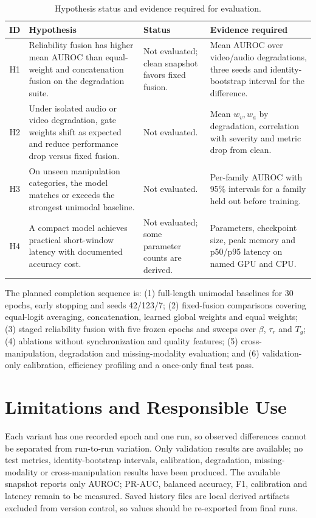\documentclass[conference]{IEEEtran}
\begin{document}
\begin{table}[t]
\caption{Hypothesis status and evidence required for evaluation.}
\label{tab:hypotheses}
\centering
\scriptsize
\setlength{\tabcolsep}{3pt}
\renewcommand{\arraystretch}{1.06}
\begin{tabular}{c>{\raggedright\arraybackslash}p{}>{\raggedright\arraybackslash}p{}>{\raggedright\arraybackslash}p{}}
\toprule
\textbf{ID} & \textbf{Hypothesis} & \textbf{Status} & \textbf{Evidence required} \\
\midrule
H1 & Reliability fusion has higher mean AUROC than equal-weight and concatenation fusion on the degradation suite. & Not evaluated; clean snapshot favors fixed fusion. & Mean AUROC over video/audio degradations, three seeds and identity-bootstrap interval for the difference. \\
H2 & Under isolated audio or video degradation, gate weights shift as expected and reduce performance drop versus fixed fusion. & Not evaluated. & Mean $w_v,w_a$ by degradation, correlation with severity and metric drop from clean. \\
H3 & On unseen manipulation categories, the model matches or exceeds the strongest unimodal baseline. & Not evaluated. & Per-family AUROC with 95\% intervals for a family held out before training. \\
H4 & A compact model achieves practical short-window latency with documented accuracy cost. & Not evaluated; some parameter counts are derived. & Parameters, checkpoint size, peak memory and p50/p95 latency on named GPU and CPU. \\
\bottomrule
\end{tabular}
\end{table}

The planned completion sequence is: (1) full-length unimodal baselines for 30 epochs, early stopping and seeds 42/123/7; (2) fixed-fusion comparisons covering equal-logit averaging, concatenation, learned global weights and equal weights; (3) staged reliability fusion with five frozen epochs and sweeps over $\beta$, $\tau_r$ and $T_g$; (4) ablations without synchronization and quality features; (5) cross-manipulation, degradation and missing-modality evaluation; and (6) validation-only calibration, efficiency profiling and a once-only final test pass.

\section{Limitations and Responsible Use}
Each variant has one recorded epoch and one run, so observed differences cannot be separated from run-to-run variation. Only validation results are available; no test metrics, identity-bootstrap intervals, calibration, degradation, missing-modality or cross-manipulation results have been produced. The available snapshot reports only AUROC; PR-AUC, balanced accuracy, F1, calibration and latency remain to be measured. Saved history files are local derived artifacts excluded from version control, so values should be re-exported from final runs.
\end{document}
